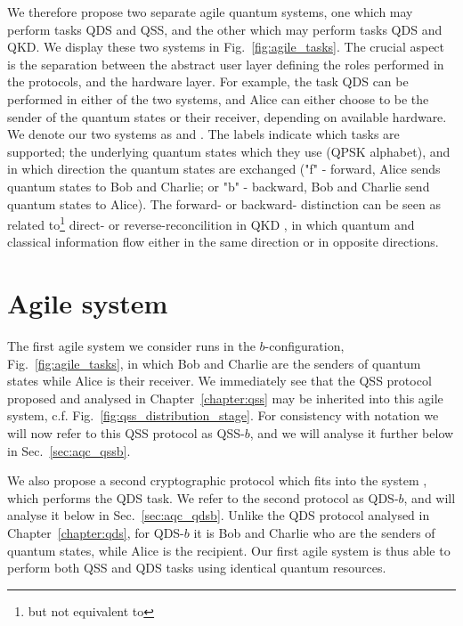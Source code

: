 We therefore propose two separate agile quantum systems, one which may perform tasks QDS and QSS, and the other which may perform tasks QDS and QKD. We display these two systems in Fig.~\ref{fig:agile_tasks}. The crucial aspect is the separation between the abstract user layer defining the roles performed in the protocols, and the hardware layer. For example, the task QDS can be performed in either of the two systems, and Alice can either choose to be the sender of the quantum states or their receiver, depending on available hardware. We denote our two systems as \systemB \;and \systemF. The labels indicate which tasks are supported; the underlying quantum states which they use (QPSK alphabet), and in which direction the quantum states are exchanged ("f" - forward, Alice sends quantum states to Bob and Charlie; or "b" - backward, Bob and Charlie send quantum states to Alice). The forward- or backward- distinction can be seen as related to\footnote{but not equivalent to} direct- or reverse-reconcilition in QKD \cite{Laudenbach2017}, in which quantum and classical information flow either in the same direction or in opposite directions.




\section{Agile system \systemB}\label{sec:aqc_systemb}
The first agile system we consider runs in the $b$-configuration, Fig.~\ref{fig:agile_tasks}, in which Bob and Charlie are the senders of quantum states while Alice is their receiver. We immediately see that the QSS protocol proposed and analysed in Chapter~\ref{chapter:qss} may be inherited into this agile system, c.f. Fig.~\ref{fig:qss_distribution_stage}. For consistency with notation we will now refer to this QSS protocol as QSS-$b$, and we will analyse it further below in Sec.~\ref{sec:aqc_qssb}.

We also propose a second cryptographic protocol which fits into the system \systemB, which performs the QDS task. We refer to the second protocol as QDS-$b$, and will analyse it below in Sec.~\ref{sec:aqc_qdsb}. Unlike the QDS protocol analysed in Chapter~\ref{chapter:qds}, for QDS-$b$ it is Bob and Charlie who are the senders of quantum states, while Alice is the recipient. %
Our first agile system \systemB \; is thus able to perform both QSS and QDS tasks using identical quantum resources. %

